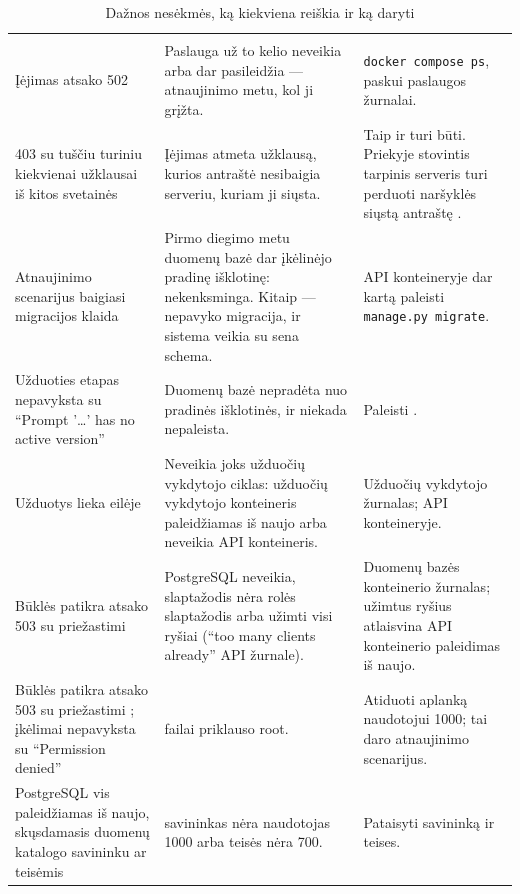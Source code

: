 \begin{xltabular}{\textwidth}{@{}L{43mm}YL{42mm}@{}}
\caption{Dažnos nesėkmės, ką kiekviena reiškia ir ką daryti}\label{tab:ops:trouble}\\
\toprule
{} &  &  \\
\midrule
\endfirsthead
\toprule
{} &  &  \\
\midrule
\endhead
\bottomrule
\endlastfoot
Įėjimas atsako 502 & Paslauga už to kelio neveikia arba dar pasileidžia --- atnaujinimo metu, kol ji grįžta. & \texttt{docker compose ps}, paskui paslaugos žurnalai. \\
403 su tuščiu turiniu kiekvienai užklausai iš kitos svetainės & Įėjimas atmeta užklausą, kurios antraštė  nesibaigia serveriu, kuriam ji siųsta. & Taip ir turi būti. Priekyje stovintis tarpinis serveris turi perduoti naršyklės siųstą antraštę . \\
Atnaujinimo scenarijus baigiasi migracijos klaida & Pirmo diegimo metu duomenų bazė dar įkėlinėjo pradinę išklotinę: nekenksminga. Kitaip --- nepavyko migracija, ir sistema veikia su sena schema. & API konteineryje dar kartą paleisti \texttt{manage.py migrate}. \\
Užduoties etapas nepavyksta su \enquote{Prompt '…' has no active version} & Duomenų bazė nepradėta nuo pradinės išklotinės, ir  niekada nepaleista. & Paleisti . \\
Užduotys lieka eilėje & Neveikia joks užduočių vykdytojo ciklas: užduočių vykdytojo konteineris paleidžiamas iš naujo arba neveikia API konteineris. & Užduočių vykdytojo žurnalas;  API konteineryje. \\
Būklės patikra atsako 503 su priežastimi  & PostgreSQL neveikia,  slaptažodis nėra rolės slaptažodis arba užimti visi ryšiai (\enquote{too many clients already} API žurnale). & Duomenų bazės konteinerio žurnalas; užimtus ryšius atlaisvina API konteinerio paleidimas iš naujo. \\
Būklės patikra atsako 503 su priežastimi ; įkėlimai nepavyksta su \enquote{Permission denied} &  failai priklauso root. & Atiduoti aplanką naudotojui 1000; tai daro atnaujinimo scenarijus. \\
PostgreSQL vis paleidžiamas iš naujo, skųsdamasis duomenų katalogo savininku ar teisėmis &  savininkas nėra naudotojas 1000 arba teisės nėra 700. & Pataisyti savininką ir teises. \\

\end{xltabular}
